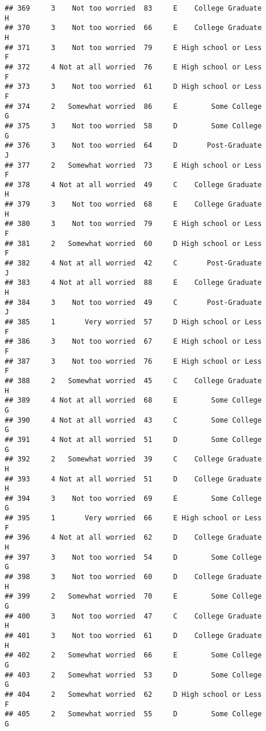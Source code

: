 \documentclass[
]{article}
\begin{document}
\begin{verbatim}
## 369     3    Not too worried  83     E    College Graduate         H
## 370     3    Not too worried  66     E    College Graduate         H
## 371     3    Not too worried  79     E High school or Less         F
## 372     4 Not at all worried  76     E High school or Less         F
## 373     3    Not too worried  61     D High school or Less         F
## 374     2   Somewhat worried  86     E        Some College         G
## 375     3    Not too worried  58     D        Some College         G
## 376     3    Not too worried  64     D       Post-Graduate         J
## 377     2   Somewhat worried  73     E High school or Less         F
## 378     4 Not at all worried  49     C    College Graduate         H
## 379     3    Not too worried  68     E    College Graduate         H
## 380     3    Not too worried  79     E High school or Less         F
## 381     2   Somewhat worried  60     D High school or Less         F
## 382     4 Not at all worried  42     C       Post-Graduate         J
## 383     4 Not at all worried  88     E    College Graduate         H
## 384     3    Not too worried  49     C       Post-Graduate         J
## 385     1       Very worried  57     D High school or Less         F
## 386     3    Not too worried  67     E High school or Less         F
## 387     3    Not too worried  76     E High school or Less         F
## 388     2   Somewhat worried  45     C    College Graduate         H
## 389     4 Not at all worried  68     E        Some College         G
## 390     4 Not at all worried  43     C        Some College         G
## 391     4 Not at all worried  51     D        Some College         G
## 392     2   Somewhat worried  39     C    College Graduate         H
## 393     4 Not at all worried  51     D    College Graduate         H
## 394     3    Not too worried  69     E        Some College         G
## 395     1       Very worried  66     E High school or Less         F
## 396     4 Not at all worried  62     D    College Graduate         H
## 397     3    Not too worried  54     D        Some College         G
## 398     3    Not too worried  60     D    College Graduate         H
## 399     2   Somewhat worried  70     E        Some College         G
## 400     3    Not too worried  47     C    College Graduate         H
## 401     3    Not too worried  61     D    College Graduate         H
## 402     2   Somewhat worried  66     E        Some College         G
## 403     2   Somewhat worried  53     D        Some College         G
## 404     2   Somewhat worried  62     D High school or Less         F
## 405     2   Somewhat worried  55     D        Some College         G

\end{verbatim}
\end{document}
